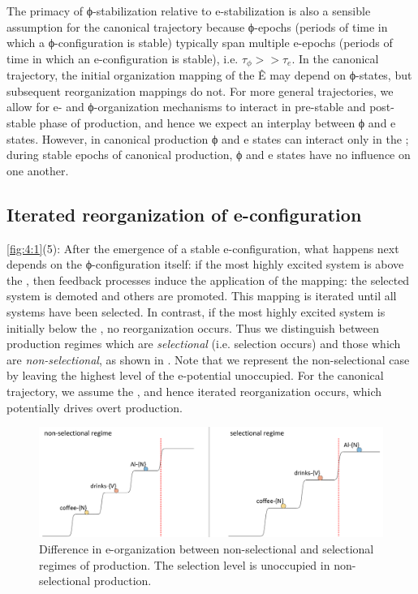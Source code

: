   The primacy of ϕ-stabilization relative to e-stabilization is also a sensible assumption for the canonical trajectory because ϕ-epochs (periods of time in which a ϕ-configuration is stable) typically span multiple e-epochs (periods of time in which an e-configuration is stable), i.e. $\tau_{\phi} >> \tau_e$. In the canonical trajectory, the initial organization mapping of the  Ê may depend on ϕ-states, but subsequent reorganization mappings do not. For more general trajectories, we allow for e- and ϕ-organization mechanisms to interact in pre-stable and post-stable phase of production, and hence we expect an interplay between ϕ and e states. However, in canonical production ϕ and e states can interact only in the ; during stable epochs of canonical production, ϕ and e states have no influence on one another. 

\subsection{Iterated reorganization of e-configuration}

\ref{fig:4:1}(5): After the emergence of a stable e-configuration, what happens next depends on the ϕ-configuration itself: if the most highly excited system is above the , then feedback processes induce the application of the  mapping: the selected system is demoted and others are promoted. This mapping is iterated until all systems have been selected. In contrast, if the most highly excited system is initially below the , no reorganization occurs. Thus we distinguish between production regimes which are \textit{selectional} (i.e. selection occurs) and those which are \textit{non-selectional}, as shown in {}. Note that we represent the non-selectional case by leaving the highest level of the e-potential unoccupied. For the canonical trajectory, we assume the , and hence iterated reorganization occurs, which potentially drives overt production. 

  
\begin{figure}
\includegraphics[width=\textwidth]{figures/Tilsen-img53.png}
\caption{Difference in e-organization between non-selectional and selectional regimes of production. The selection level is unoccupied in non-selectional production.}
\label{fig:4:3}
\end{figure}
 

